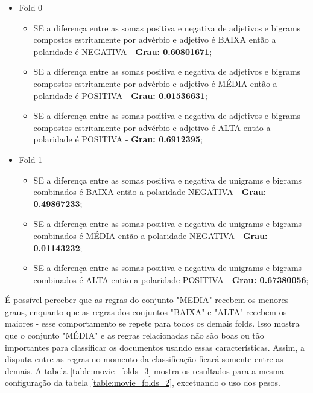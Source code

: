 \documentclass[template.tex]{subfiles}
\begin{document}
\begin{itemize}
\item Fold 0
\begin{itemize}
\item SE a diferença entre as somas positiva e negativa de adjetivos e bigrams compostos estritamente por advérbio e adjetivo é BAIXA então a polaridade é NEGATIVA - \textbf{Grau: 0.60801671};
\item SE a diferença entre as somas positiva e negativa de adjetivos e bigrams compostos estritamente por advérbio e adjetivo é MÉDIA então a polaridade é POSITIVA - \textbf{Grau: 0.01536631};
\item SE a diferença entre as somas positiva e negativa de adjetivos e bigrams compostos estritamente por advérbio e adjetivo é ALTA então a polaridade é POSITIVA  - \textbf{Grau: 0.6912395};
\end{itemize}
\item Fold 1
\begin{itemize}
\item SE a diferença entre as somas positiva e negativa de unigrams e bigrams combinados é BAIXA então a polaridade NEGATIVA  - \textbf{Grau: 0.49867233};
\item SE a diferença entre as somas positiva e negativa de unigrams e bigrams combinados é MÉDIA então a polaridade NEGATIVA  - \textbf{Grau: 0.01143232};
\item SE a diferença entre as somas positiva e negativa de unigrams e bigrams combinados é ALTA então a polaridade POSITIVA  - \textbf{Grau: 0.67380056};
\end{itemize}
\end{itemize}

É possível perceber que as regras do conjunto "MEDIA" recebem os menores graus, enquanto que as regras dos conjuntos "BAIXA" e "ALTA" recebem os maiores - esse comportamento se repete para todos os demais folds. Isso mostra que o conjunto "MÉDIA" e as regras relacionadas não são boas ou tão importantes para classificar os documentos usando essas características. Assim, a disputa entre as regras no momento da classificação ficará somente entre as demais. A tabela \ref{table:movie_folds_3} mostra os resultados para a mesma configuração da tabela \ref{table:movie_folds_2}, excetuando o uso dos pesos. 

\end{document}
